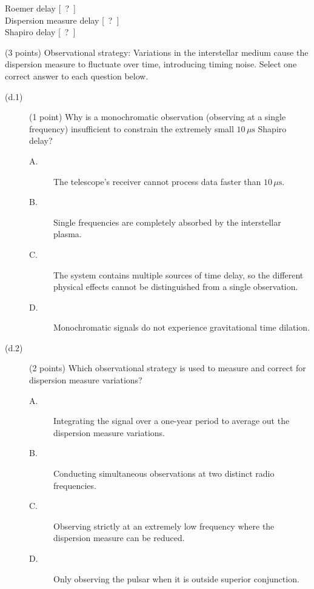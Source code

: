 \begin{description}
  Roemer delay [\ ?\ ]\\
  Dispersion measure delay [\ ?\ ]\\
  Shapiro delay [\ ?\ ]
\item[(d)] (3 points) Observational strategy: Variations in the interstellar
  medium cause the dispersion measure to fluctuate over time, introducing
  timing noise. Select one correct answer to each question below.
  \begin{description}
  \item[(d.1)] (1 point) Why is a monochromatic observation (observing at a
    single frequency) insufficient to constrain the extremely small
    $10\,\mu\mathrm{s}$ Shapiro delay?
    \begin{description}
    \item[A.] The telescope's receiver cannot process data faster than
      $10\,\mu\mathrm{s}$.
    \item[B.] Single frequencies are completely absorbed by the interstellar
      plasma.
    \item[C.] The system contains multiple sources of time delay, so the
      different physical effects cannot be distinguished from a single
      observation.
    \item[D.] Monochromatic signals do not experience gravitational time
      dilation.
    \end{description}
  \item[(d.2)] (2 points) Which observational strategy is used to measure and
    correct for dispersion measure variations?
    \begin{description}
    \item[A.] Integrating the signal over a one-year period to average out
      the dispersion measure variations.
    \item[B.] Conducting simultaneous observations at two distinct radio
      frequencies.
    \item[C.] Observing strictly at an extremely low frequency where the
      dispersion measure can be reduced.
    \item[D.] Only observing the pulsar when it is outside superior
      conjunction.
    \end{description}
  \end{description}
\end{description}
